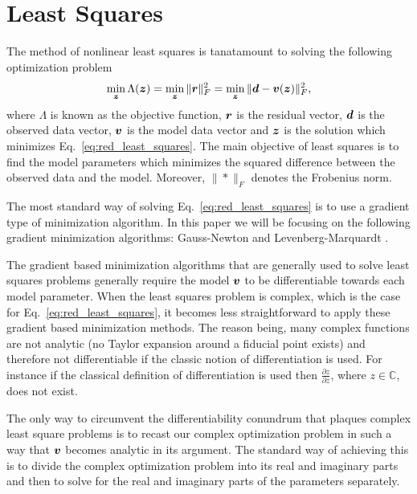 \documentclass[useAMS,usenatbib]{mn2e}
\newcommand{\bz}{\bmath{z}}
\newcommand{\br}{\bmath{r}}
\newcommand{\bd}{\bmath{d}}
\newcommand{\bv}{\bmath{v}}
\newcommand{\conj}[1]{\overline{#1}}
\begin{document}
\section{Least Squares}
The method of nonlinear least squares is tanatamount to solving the following optimization problem  
\begin{equation}
\label{eq:red_least_squares}
\min_{\bz} \Lambda(\bz) = \min_{\bz} \|\br\|_F^2 = \min_{\bz} \|\bd - \bv(\bz)\|_F^2, 
\end{equation}
where $\Lambda$ is known as the objective function, $\br$ is the residual vector, $\bd$ is the observed data vector, $\bv$ is the model data vector and $\bz$ is the solution which minimizes Eq.~\eqref{eq:red_least_squares}.
The main objective of least squares is to find the model parameters which minimizes the squared difference between the observed data and the model. Moreover, $\|*\|_F$ denotes the 
Frobenius norm.

The most standard way of solving Eq.~\eqref{eq:red_least_squares} is to use a gradient type of minimization algorithm. In this paper we will be focusing on the following gradient minimization algorithms: Gauss-Newton and Levenberg-Marquardt \citep{Levenberg1944,Marquardt1963}. 

The gradient based minimization algorithms that are generally used to solve least squares problems generally require the model $\bv$ to be differentiable
towards each model parameter. When the least squares problem is complex, which is the case for Eq.~\eqref{eq:red_least_squares}, it becomes less straightforward to apply these gradient based minimization methods. The reason being,
many complex functions are not analytic (no Taylor expansion around a fiducial point exists) and therefore not differentiable if the classic notion of differentiation is used. For instance if the 
classical definition of differentiation is used then $\frac{\partial z}{\partial \conj{z}}$, where $z \in \mathbb{C}$, does not exist.

The only way to circumvent the differentiability conundrum that plaques complex least square problems is to recast our complex optimization problem in such a way that $\bv$ becomes analytic in its argument.
The standard way of achieving this is to divide the complex optimization problem into its real and imaginary parts and then to solve for the real and imaginary parts of the parameters separately.
\end{document}
